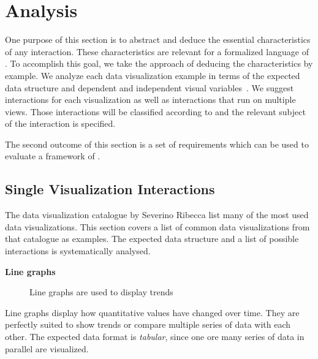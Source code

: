 \chapter{Analysis}\label{sec:analysis}
One purpose of this section is to abstract and deduce the essential characteristics of any interaction.
These characteristics are relevant for a formalized language of \cmvs{}.
To accomplish this goal, we take the approach of deducing the characteristics by example.
We analyze each data visualization example in terms of the expected data structure and dependent and independent visual variables~\cite{Bertin2010}.
We suggest interactions for each visualization as well as interactions that run on multiple views.
Those interactions will be classified according to \textcite{Yi2007} and the relevant subject of the interaction is specified.

The second outcome of this section is a set of requirements which can be used to evaluate a framework of \cmvs{}.


\section{Single Visualization Interactions}\label{sec:analysis:examples:single}

The data visualization catalogue by Severino Ribecca list many of the most used data visualizations\cite{VisualizationCatalogue2017}.
This section covers a list of common data visualizations from that catalogue as examples.
The expected data structure and a list of possible interactions is systematically analysed.

\textbf{Line graphs}
\begin{figure}
  \begin{center}
    \qquad
  \end{center}
  \caption{Line graphs are used to display trends}
  \label{fig:analysis:line-graphs}
\end{figure}

Line graphs display how quantitative values have changed over time.
They are perfectly suited to show trends or compare multiple series of data with each other.
The expected data format is \emph{tabular}, since one ore many series of data in parallel are visualized.

